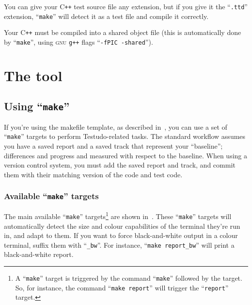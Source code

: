 \documentclass[twoside, a4paper, article]{memoir}
\newcommand*\Cpp{C\texttt{++}}
\begin{document}
You can give your \Cpp{} test source file any extension, but if you give it the
``\texttt{.ttd}'' extension, ``\texttt{make}'' will detect it as a test file
and compile it correctly.

Your \Cpp{} must be compiled into a shared object file (this is automatically
done by ``\texttt{make}'', using \textsc{gnu} \texttt{g++} flags
``\texttt{-fPIC -shared}'').

\section{The tool}

\subsection{Using ``\texttt{make}''}
\label{sec:using-make}

If you're using the makefile template, as described
in~, you can use a set of ``\texttt{make}'' targets
to perform Testudo-related tasks.  The standard workflow assumes you have a
saved report and a saved track that represent your ``baseline''; differences
and progress and measured with respect to the baseline.  When using a version
control system, you must add the saved report and track, and commit them with
their matching version of the code and test code.

\subsubsection{Available ``\texttt{make}'' targets}
\label{sec:available-make-targets}

The main available ``\texttt{make}'' targets\footnote{A ``\texttt{make}''
  target is triggered by the command ``\texttt{make}'' followed by the target.
  So, for instance, the command ``\texttt{make report}'' will trigger the
  ``\texttt{report}'' target.} are shown in~.
These ``\texttt{make}'' targets will automatically detect the size and colour
capabilities of the terminal they're run in, and adapt to them.  If you want to
force black-and-white output in a colour terminal, suffix them with
``\texttt{\_bw}''.  For instance, ``\texttt{make report\_bw}'' will print a
black-and-white report.
\end{document}
